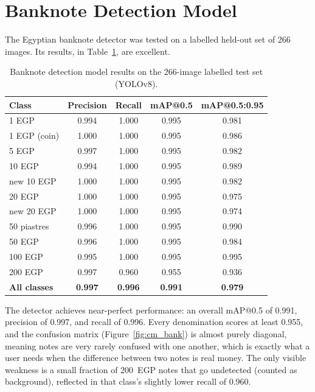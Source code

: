 \section{Banknote Detection Model}

The Egyptian banknote detector was tested on a labelled held-out set of 266 images. Its results, in Table~\ref{tab:bank_results}, are excellent.

\begin{table}[H]
\centering
\caption{Banknote detection model results on the 266-image labelled test set (YOLOv8).}
\label{tab:bank_results}
\begin{tabular}{lcccc}
\toprule
\textbf{Class} & \textbf{Precision} & \textbf{Recall} & \textbf{mAP@0.5} & \textbf{mAP@0.5:0.95} \\
\midrule
1 EGP & 0.994 & 1.000 & 0.995 & 0.981 \\
1 EGP (coin) & 1.000 & 1.000 & 0.995 & 0.986 \\
5 EGP & 0.997 & 1.000 & 0.995 & 0.982 \\
10 EGP & 0.994 & 1.000 & 0.995 & 0.989 \\
new 10 EGP & 1.000 & 1.000 & 0.995 & 0.982 \\
20 EGP & 1.000 & 1.000 & 0.995 & 0.975 \\
new 20 EGP & 1.000 & 1.000 & 0.995 & 0.974 \\
50 piastres & 0.996 & 1.000 & 0.995 & 0.990 \\
50 EGP & 0.996 & 1.000 & 0.995 & 0.984 \\
100 EGP & 0.995 & 1.000 & 0.995 & 0.995 \\
200 EGP & 0.997 & 0.960 & 0.955 & 0.936 \\
\midrule
\textbf{All classes} & \textbf{0.997} & \textbf{0.996} & \textbf{0.991} & \textbf{0.979} \\
\bottomrule
\end{tabular}
\end{table}

The detector achieves near-perfect performance: an overall mAP@0.5 of 0.991, precision of 0.997, and recall of 0.996. Every denomination scores at least 0.955, and the confusion matrix (Figure~\ref{fig:cm_bank}) is almost purely diagonal, meaning notes are very rarely confused with one another, which is exactly what a user needs when the difference between two notes is real money. The only visible weakness is a small fraction of 200~EGP notes that go undetected (counted as background), reflected in that class's slightly lower recall of 0.960.

